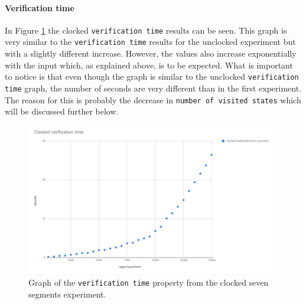 \paragraph{Verification time}
In Figure \ref{fig:clocked_verification} the clocked \texttt{verification time}
results can be seen.
This graph is very similar to the \texttt{verification time} results for the unclocked experiment but with a slightly different increase. However, the values also increase exponentially with the input which, as explained above, is to be expected. What is important to notice is that even though the graph is similar to the unclocked \texttt{verification time} graph, the number of seconds are very different than in the first experiment. The reason for this is probably the decrease in \texttt{number of visited states} which will be discussed further below.
\begin{figure}
    \includegraphics[width=0.98\textwidth]{./figures/temporary_figures/clocked_verification_time.jpg}
\caption{Graph of the \texttt{verification time} property from the clocked seven segments experiment.}
\label{fig:clocked_verification}
\end{figure}
